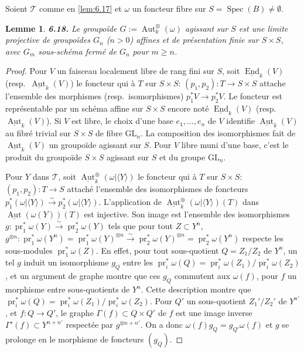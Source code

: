 \documentclass[12pt,a4paper]{article}
\theoremstyle{plain}
\newtheorem{lemma}[theorem]{Lemme}
\theoremstyle{definition}
\theoremstyle{remark}
\DeclareMathOperator{\End}{End}
\DeclareMathOperator{\Aut}{Aut}
\DeclareMathOperator{\Spec}{Spec}
\DeclareMathOperator{\pr}{pr}
\begin{document}
Soient $\mathcal{T}$ comme en \ref{lem:6.17} et $\omega$ un foncteur fibre sur $S = \Spec(B) \neq \emptyset$.

\begin{lemma}\label{lem:6.18}
\textbf{6.18.} Le groupoïde $G := \Aut^\otimes_k(\omega)$ agissant sur $S$ est une limite projective de groupoïdes $G_n$ ($n > 0$) affines et de présentation finie sur $S \times S$, avec $G_m$ sous-schéma fermé de $G_n$ pour $m \geq n$.
\end{lemma}

\begin{proof}
Pour $V$ un faisceau localement libre de rang fini sur $S$, soit $\underline{\End}_k(V)$ (resp.~$\underline{\Aut}_k(V)$) le foncteur qui à $T$ sur $S \times S$: $(p_1,p_2) : T \to S \times S$ attache l'ensemble des morphismes (resp.~isomorphismes) $p_1^* V \to p_2^* V$. Le foncteur est représentable par un schéma affine sur $S \times S$ encore noté $\underline{\End}_k(V)$ (resp.~$\underline{\Aut}_k(V)$). Si $V$ est libre, le choix d'une base $e_1, \ldots, e_n$ de $V$ identifie $\underline{\Aut}_k(V)$ au fibré trivial sur $S \times S$ de fibre $\mathrm{GL}_n$. La composition des isomorphismes fait de $\underline{\Aut}_k(V)$ un groupoïde agissant sur $S$. Pour $V$ libre muni d'une base, c'est le produit du groupoïde $S \times S$ agissant sur $S$ et du groupe $\mathrm{GL}_n$.

Pour $Y$ dans $\mathcal{T}$, soit $\underline{\Aut}^\otimes_k(\omega|\langle Y \rangle)$ le foncteur qui à $T$ sur $S \times S$: $(p_1,p_2) : T \to S$ attaché l'ensemble des isomorphismes de foncteurs $p_1^*(\omega|\langle Y \rangle) \xrightarrow{\sim} p_2^*(\omega|\langle Y \rangle)$. L'application de $\underline{\Aut}^\otimes_k(\omega|\langle Y \rangle)(T)$ dans $\underline{\Aut}(\omega(Y))(T)$ est injective. Son image est l'ensemble des isomorphismes $g : \pr_1^* \omega(Y) \xrightarrow{\sim} \pr_2^* \omega(Y)$ tels que pour tout $Z \subset Y^n$, $g^{\otimes n} : \pr_1^* \omega(Y^n) = \pr_1^* \omega(Y)^{\otimes n} \xrightarrow{\sim} \pr_2^* \omega(Y)^{\otimes n} = \pr_2^* \omega(Y^n)$ respecte les sous-modules $\pr_1^* \omega(Z)$. En effet, pour tout sous-quotient $Q = Z_1/Z_2$ de $Y^n$, un tel $g$ induit un isomorphisme $g_Q$ entre les $\pr_i^* \omega(Q) = \pr_i^* \omega(Z_1)/\pr_i^* \omega(Z_2)$, et un argument de graphe montre que ces $g_Q$ commutent aux $\omega(f)$, pour $f$ un morphisme entre sous-quotients de $Y^n$. Cette description montre que $\pr_i^* \omega(Q) = \pr_i^* \omega(Z_1)/\pr_i^* \omega(Z_2)$. Pour $Q'$ un sous-quotient $Z_1'/Z_2'$ de $Y^{n'}$, et $f : Q \to Q'$, le graphe $\Gamma(f) \subset Q \times Q'$ de $f$ est une image inverse $\Gamma'(f) \subset Y^{n+n'}$ respectée par $g^{\otimes n+n'}$. On a donc $\omega(f) g_Q = g_{Q'} \omega(f)$ et $g$ se prolonge en le morphisme de foncteurs $(g_Q)$.


\end{proof}
\end{document}
